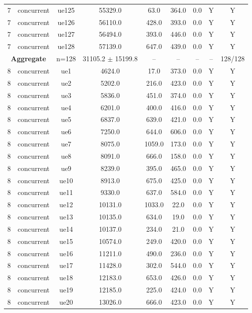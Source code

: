 \begin{table}[ht]
\begin{tabular}{|c|c|c|c|c|c|c|c|c|}
7 & concurrent & ue125 & 55329.0 & 63.0 & 364.0 & 0.0 & Y & Y \\
7 & concurrent & ue126 & 56110.0 & 428.0 & 393.0 & 0.0 & Y & Y \\
7 & concurrent & ue127 & 56494.0 & 393.0 & 446.0 & 0.0 & Y & Y \\
7 & concurrent & ue128 & 57139.0 & 647.0 & 439.0 & 0.0 & Y & Y \\
\multicolumn{2}{|c|}{\textbf{Aggregate}} & n=128 & 31105.2 $\pm$ 15199.8 & -- & -- & -- & -- & 128/128 \\
\hline
8 & concurrent & ue1 & 4624.0 & 17.0 & 373.0 & 0.0 & Y & Y \\
8 & concurrent & ue2 & 5202.0 & 216.0 & 423.0 & 0.0 & Y & Y \\
8 & concurrent & ue3 & 5836.0 & 451.0 & 374.0 & 0.0 & Y & Y \\
8 & concurrent & ue4 & 6201.0 & 400.0 & 416.0 & 0.0 & Y & Y \\
8 & concurrent & ue5 & 6837.0 & 639.0 & 421.0 & 0.0 & Y & Y \\
8 & concurrent & ue6 & 7250.0 & 644.0 & 606.0 & 0.0 & Y & Y \\
8 & concurrent & ue7 & 8075.0 & 1059.0 & 173.0 & 0.0 & Y & Y \\
8 & concurrent & ue8 & 8091.0 & 666.0 & 158.0 & 0.0 & Y & Y \\
8 & concurrent & ue9 & 8239.0 & 395.0 & 465.0 & 0.0 & Y & Y \\
8 & concurrent & ue10 & 8913.0 & 675.0 & 425.0 & 0.0 & Y & Y \\
8 & concurrent & ue11 & 9330.0 & 637.0 & 584.0 & 0.0 & Y & Y \\
8 & concurrent & ue12 & 10131.0 & 1033.0 & 22.0 & 0.0 & Y & Y \\
8 & concurrent & ue13 & 10135.0 & 634.0 & 19.0 & 0.0 & Y & Y \\
8 & concurrent & ue14 & 10137.0 & 234.0 & 21.0 & 0.0 & Y & Y \\
8 & concurrent & ue15 & 10574.0 & 249.0 & 420.0 & 0.0 & Y & Y \\
8 & concurrent & ue16 & 11211.0 & 490.0 & 236.0 & 0.0 & Y & Y \\
8 & concurrent & ue17 & 11428.0 & 302.0 & 544.0 & 0.0 & Y & Y \\
8 & concurrent & ue18 & 12183.0 & 653.0 & 426.0 & 0.0 & Y & Y \\
8 & concurrent & ue19 & 12185.0 & 225.0 & 424.0 & 0.0 & Y & Y \\
8 & concurrent & ue20 & 13026.0 & 666.0 & 423.0 & 0.0 & Y & Y \\

\end{tabular}
\end{table}
